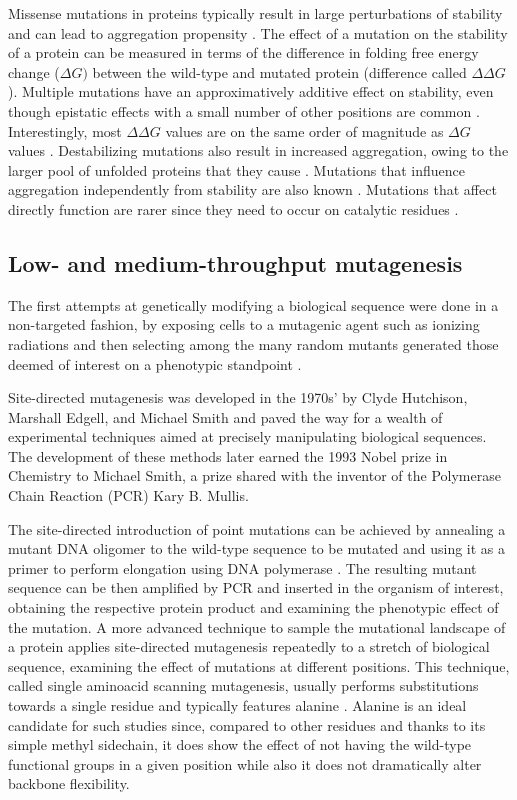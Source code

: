 Missense mutations in proteins typically result in large perturbations of stability and can lead to aggregation propensity \parencite{DePristo2005}.
The effect of a mutation on the stability of a protein can be measured in terms of the difference in folding free energy change ($\Delta G)$ between the wild-type and mutated protein (difference called $\Delta\Delta G$).
Multiple mutations have an approximatively additive effect on stability, even though epistatic effects with a small number of other positions are common \parencite{Daopin1991, Green1993}.
Interestingly, most $\Delta\Delta G$ values are on the same order of magnitude as $\Delta G$ values \parencite{DePristo2005}.
Destabilizing mutations also result in increased aggregation, owing to the larger pool of unfolded proteins that they cause \parencite{Chiti2000,RamirezAlvarado2000}.
Mutations that influence aggregation independently from stability are also known \parencite{Mitraki1991,Pawar2005}.
Mutations that affect directly function are rarer since they need to occur on catalytic residues \parencite{DePristo2005}.


\subsection{Low- and medium-throughput mutagenesis}
The first attempts at genetically modifying a biological sequence were done in a non-targeted fashion, by exposing cells to a mutagenic agent such as ionizing radiations and then selecting among the many random mutants generated those deemed of interest on a phenotypic standpoint \parencite{Muller1927, Stadler1928}.

Site-directed mutagenesis \parencite[reviewed in][]{Shortle1981} was developed in the 1970s' by Clyde Hutchison, Marshall Edgell, and Michael Smith and paved the way for a wealth of experimental techniques aimed at precisely manipulating biological sequences.
The development of these methods later earned the 1993 Nobel prize in Chemistry to Michael Smith, a prize shared with the inventor of the Polymerase Chain Reaction (PCR) Kary B. Mullis.

The site-directed introduction of point mutations can be achieved by annealing a mutant DNA oligomer to the wild-type sequence to be mutated and using it as a primer to perform elongation using DNA polymerase \parencite{Hutchison1978}.
The resulting mutant sequence can be then amplified by PCR and inserted in the organism of interest, obtaining the respective protein product and examining the phenotypic effect of the mutation.
A more advanced technique to sample the mutational landscape of a protein applies site-directed mutagenesis repeatedly to a stretch of biological sequence, examining the effect of mutations at different positions.
This technique, called single aminoacid scanning mutagenesis, usually performs substitutions towards a single residue and typically features alanine \parencite[reviewed in][]{Morrison2001}.
Alanine is an ideal candidate for such studies since, compared to other residues and thanks to its simple methyl sidechain, it does show the effect of not having the wild-type functional groups in a given position while also it does not dramatically alter backbone flexibility.

